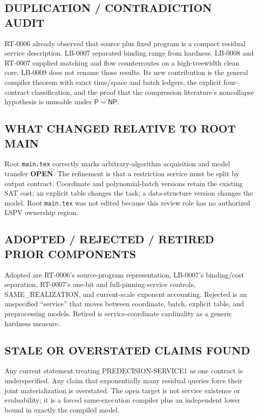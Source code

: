 \documentclass[11pt]{article}
\newcommand{\OPEN}{\textbf{OPEN}}
\begin{document}
\subsection*{DUPLICATION / CONTRADICTION AUDIT}
RT-0006 already observed that source plus fixed program is a compact residual
service description.  LB-0007 separated binding range from hardness.  LB-0008
and RT-0007 supplied matching and flow counterroutes on a high-treewidth clean
core.  LB-0009 does not rename those results.  Its new contribution is the
general compiler theorem with exact time/space and batch ledgers, the explicit
four-contract classification, and the proof that the compression literature's
noncollapse hypothesis is unusable under $\mathsf P=\mathsf{NP}$.

\subsection*{WHAT CHANGED RELATIVE TO ROOT MAIN}
Root \texttt{main.tex} correctly marks arbitrary-algorithm acquisition and
model transfer \OPEN.  The refinement is that a restriction service must be
split by output contract.  Coordinate and polynomial-batch versions retain
the existing SAT cost; an explicit table changes the task; a data-structure
version changes the model.  Root \texttt{main.tex} was not edited because this
review role has no authorized LSPV ownership region.

\subsection*{ADOPTED / REJECTED / RETIRED PRIOR COMPONENTS}
Adopted are RT-0006's source-program representation, LB-0007's binding/cost
separation, RT-0007's one-bit and full-pinning-service controls, SAME\_REALIZATION,
and current-scale exponent accounting.  Rejected is an unspecified ``service''
that moves between coordinate, batch, explicit table, and preprocessing models.
Retired is service-coordinate cardinality as a generic hardness measure.

\subsection*{STALE OR OVERSTATED CLAIMS FOUND}
Any current statement treating PREDECISION-SERVICE1 as one contract is
underspecified.  Any claim that exponentially many residual queries force
their joint materialization is overstated.  The open target is not service
existence or evaluability; it is a forced same-execution compiler plus an
independent lower bound in exactly the compiled model.
\end{document}
